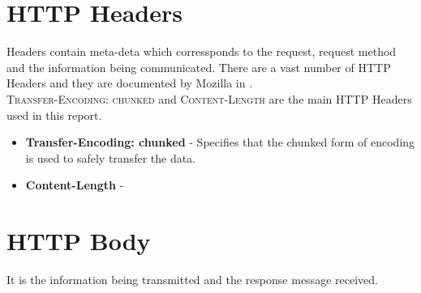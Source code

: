 \section{HTTP Headers}
Headers contain meta-deta which corressponds to the request, request method and the information being communicated. There are a vast number of HTTP Headers and they are documented by Mozilla in \cite{b17}.\\
\textsc{Transfer-Encoding: chunked} and \textsc{Content-Length} are the main HTTP Headers used in this report. \\
\begin{itemize}
	\item \textbf{Transfer-Encoding: chunked} \cite{b18} - Specifies that the chunked form of encoding is used to safely transfer the data.
	\item \textbf{Content-Length} \cite{b19} - 
\end{itemize}
\section{HTTP Body}
It is the information being transmitted and the response message received.